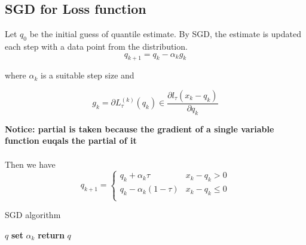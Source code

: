 \subsection{SGD for Loss function}

Let $q_0$ be the initial guess of quantile estimate. 
By SGD, the estimate is updated each step with a data point from the distribution.
\begin{equation}
    q_{k+1} = q_k - \alpha_k g_k
\end{equation}

where $ \alpha_k $ is a suitable step size and 

\begin{equation}
    g_k = \partial L_{\tau}^{(k)}(q_k) \in \frac{\partial l_\tau(x_k - q_k)}{\partial q_k}
\end{equation}
 
\textbf{Notice: partial is taken because the gradient of a single variable function
euqals the partial of it}
\\\\
Then we have
\begin{equation*}
    q_{k+1} = 
    \begin{cases}
        q_k + \alpha_k \tau               & x_k - q_k > 0\\
        q_k - \alpha_k (1-\tau)           & x_k - q_k \leq 0\\
    \end{cases}
\end{equation*}


\begin{algorithm}
    \caption{SGD algorithm}\label{alg:SGD}
    \begin{algorithmic}[1]
         $q$                 
                              
                \State \textbf{set} $\alpha_k$  
                                  
                \Else                           {}
                \EndIf
            \EndFor
        \State \textbf{return} $q$              
    \end{algorithmic}
\end{algorithm}
